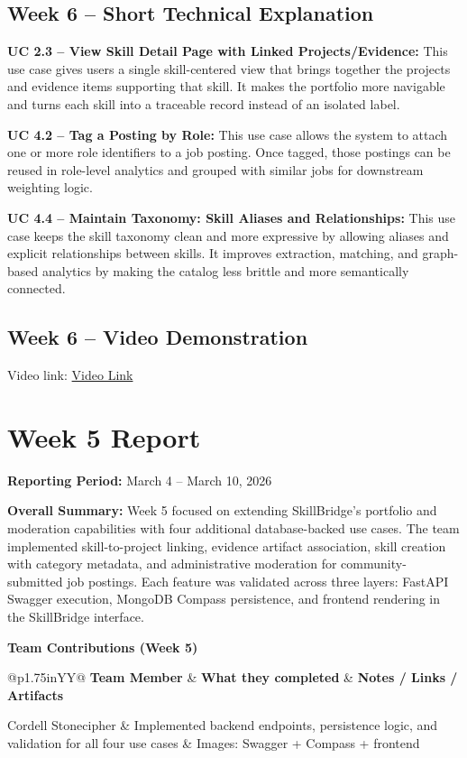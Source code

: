 \documentclass[11pt]{article}
\makeatletter
\newcommand{\WeekReport}[4]{
  \clearpage
  \section*{Week #1 Report}
  \addcontentsline{toc}{section}{Week #1 Report}
  \vspace{-0.25em}
  \noindent\textbf{Reporting Period:} #2

  \vspace{0.5em}
  \noindent\textbf{Overall Summary:} #3

  \vspace{0.75em}
  \noindent\textbf{Team Contributions (Week #1)}
  \vspace{0.25em}

  \begin{table}[H]
    \renewcommand{\arraystretch}{1.2}
    \begin{tabularx}{\linewidth}{@{}p{1.75in}YY@{}}
      \toprule
      \textbf{Team Member} & \textbf{What they completed} & \textbf{Notes / Links / Artifacts} \\
      \midrule
      #4
      \bottomrule
    \end{tabularx}
  \end{table}
}
\makeatother
\begin{document}
\subsection*{Week 6 -- Short Technical Explanation}

\noindent
\textbf{UC 2.3 -- View Skill Detail Page with Linked Projects/Evidence:}
This use case gives users a single skill-centered view that brings together the projects and evidence items supporting that skill. It makes the portfolio more navigable and turns each skill into a traceable record instead of an isolated label.

\noindent
\textbf{UC 4.2 -- Tag a Posting by Role:}
This use case allows the system to attach one or more role identifiers to a job posting. Once tagged, those postings can be reused in role-level analytics and grouped with similar jobs for downstream weighting logic.

\noindent
\textbf{UC 4.4 -- Maintain Taxonomy: Skill Aliases and Relationships:}
This use case keeps the skill taxonomy clean and more expressive by allowing aliases and explicit relationships between skills. It improves extraction, matching, and graph-based analytics by making the catalog less brittle and more semantically connected.

\subsection*{Week 6 -- Video Demonstration}
\noindent
Video link: \href{https://www.loom.com/share/96c9d1b5e2f143ffba567365d12ab4ae}{Video Link}

\WeekReport{5}{March 4 -- March 10, 2026}{
Week 5 focused on extending SkillBridge’s portfolio and moderation capabilities with four additional database-backed use cases. The team implemented skill-to-project linking, evidence artifact association, skill creation with category metadata, and administrative moderation for community-submitted job postings. Each feature was validated across three layers: FastAPI Swagger execution, MongoDB Compass persistence, and frontend rendering in the SkillBridge interface.
}{
Cordell Stonecipher & Implemented backend endpoints, persistence logic, and validation for all four use cases & Images: Swagger + Compass + frontend \\
}
\end{document}
